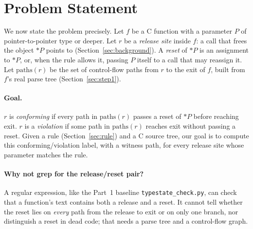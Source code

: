 \section{Problem Statement}
\label{sec:problem}

We now state the problem precisely. Let $f$ be a C function with a
parameter $P$ of pointer-to-pointer type or deeper. Let $r$ be a
\emph{release site} inside $f$: a call that frees the object $*P$ points
to (Section~\ref{sec:background}). A \emph{reset} of $*P$ is an assignment
to $*P$, or, when the rule allows it, passing $P$ itself to a call that
may reassign it. Let $\mathrm{paths}(r)$ be the set of control-flow paths
from $r$ to the exit of $f$, built from $f$'s real parse tree
(Section~\ref{sec:step1}).

\paragraph{Goal.} $r$ is \emph{conforming} if every path in
$\mathrm{paths}(r)$ passes a reset of $*P$ before reaching exit. $r$ is a
\emph{violation} if some path in $\mathrm{paths}(r)$ reaches exit without
passing a reset. Given a rule (Section~\ref{sec:rule}) and a C source
tree, our goal is to compute this conforming/violation label, with a
witness path, for every release site whose parameter matches the rule.

\paragraph{Why not grep for the release/reset pair?} A regular expression,
like the Part~1 baseline \texttt{typestate\_check.py}, can check that a
function's text contains both a release and a reset. It cannot tell
whether the reset lies on \emph{every} path from the release to exit or on
only one branch, nor distinguish a reset in dead code; that needs a parse
tree and a control-flow graph.
